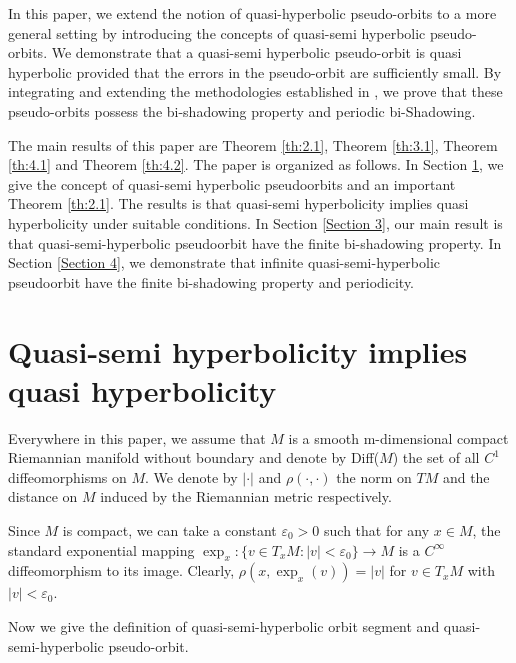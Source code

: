 \documentclass[12pt]{article}
\begin{document}
In this paper, we extend the notion of quasi-hyperbolic pseudo-orbits to a more general setting by introducing the concepts of quasi-semi hyperbolic pseudo-orbits. We demonstrate that a quasi-semi hyperbolic pseudo-orbit is quasi hyperbolic  provided that the errors in the pseudo-orbit are sufficiently small. By integrating and extending the methodologies established in \cite{LC,PD3,HZ,ZF}, we prove that these pseudo-orbits possess the bi-shadowing property and periodic bi-Shadowing. 

The main results of this paper are Theorem \ref{th:2.1}, Theorem \ref{th:3.1}, Theorem \ref{th:4.1} and Theorem \ref{th:4.2}.
The paper is organized as follows. In Section \ref{Section 2}, we give the concept of quasi-semi hyperbolic pseudoorbits and an important Theorem \ref{th:2.1}. The results is that quasi-semi hyperbolicity implies quasi hyperbolicity under suitable conditions. In Section \ref{Section 3},  our main result is that quasi-semi-hyperbolic pseudoorbit have the finite bi-shadowing property. In Section \ref{Section 4}, we demonstrate that infinite quasi-semi-hyperbolic pseudoorbit have the finite bi-shadowing property and periodicity.

\section{Quasi-semi hyperbolicity implies quasi hyperbolicity}\label{Section 2}

Everywhere in this paper, we assume that $ M $ is a smooth m-dimensional compact Riemannian
manifold without boundary and denote by Diff($ M $) the set of all $ C^1 $ diffeomorphisms on $ M $. We denote by $ |\cdot| $ and $ \rho (\cdot, \cdot) $ the norm on $ TM $ and the distance on $ M $ induced by the Riemannian metric respectively.

Since $ M $ is compact, we can take a constant $ \varepsilon_0 > 0 $  such that for any $ x\in M$, the standard exponential mapping $\exp_x:\{v\in T_{x}M:|v|<\varepsilon_0\} \rightarrow M $ is a $ C^\infty $ diffeomorphism to its image. Clearly, $ \rho (x, \exp_x(v))=|v| $ for $ v\in T_{x}M $ with $ |v|<\varepsilon_0 $.

Now we give the definition of quasi-semi-hyperbolic orbit segment and quasi-semi-hyperbolic pseudo-orbit.
\end{document}
